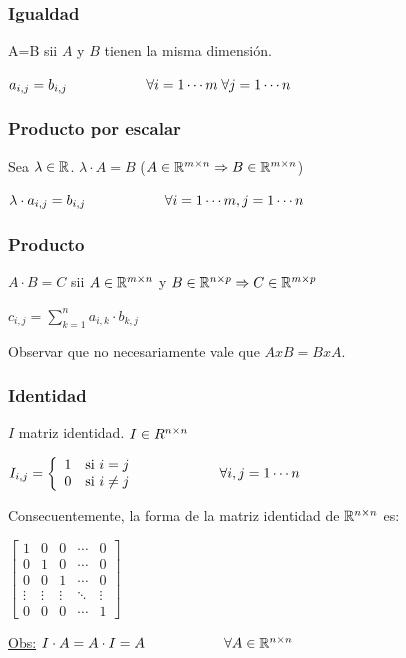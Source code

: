 \documentclass[]{article}
\begin{document}
\subsubsection{Igualdad}
A=B sii $A$ y $B$ tienen la misma dimensión.
	\begin{center}
		$a_{i,j} = b_{i,j} \hspace{2cm} \forall i=1\cdots m \; \forall j = 1\cdots n$
	\end{center}

\subsubsection{Producto por escalar}
Sea $\lambda \in \mathbb{R}$. $\lambda \cdot A = B$ ($A\in\mathbb{R}^{m\times n} \Rightarrow B \in \mathbb{R}^{m\times n}$)
	\begin{center}
		$\lambda \cdot a_{i,j} = b_{i,j}\hspace{2cm} \forall i = 1 \cdots m , j = 1 \cdots n$
	\end{center}

\subsubsection{Producto} $A\cdot B = C$ sii $A\in\mathbb{R}^{m\times n}$ y $B\in\mathbb{R}^{n\times p} \Rightarrow C\in\mathbb{R}^{m\times p}$
	\begin{center}
		$c_{i,j} = \displaystyle \sum_{k=1}^n a_{i,k}\cdot b_{k,j}$
	\end{center}
	Observar que no necesariamente vale que $AxB = BxA$.

\subsubsection{Identidad} $I$ matriz identidad. $I \in R^{n\times n}$
	\begin{center}$I_{i,j} =
		\left\{ \begin{array}{lll} 1 & \mbox{si } i=j \\ 0 & \mbox{si } i\neq j \end{array} \right. \hspace{2cm} \forall i,j=1\cdots n$
	\end{center}
	Consecuentemente, la forma de la matriz identidad de $\mathbb{R}^{n\times n}$ es:
	\begin{center}
		$\begin{bmatrix}
			1 & 0 & 0 & \cdots & 0 \\
			0 & 1 & 0 & \cdots & 0 \\
			0 & 0 & 1 & \cdots & 0 \\
			\vdots & \vdots & \vdots & \ddots & \vdots \\
			0 & 0 & 0 & \cdots & 1
		\end{bmatrix}$
	\end{center}

\underline{Obs:} $I \cdot A = A \cdot I = A \hspace{2cm} \forall A\in\mathbb{R}^{n\times n}$
\end{document}
